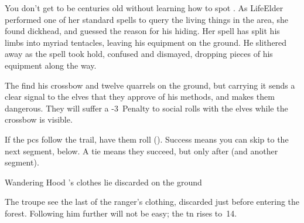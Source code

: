 \begin{exampletext}
  You don't get to be centuries old without learning how to spot .
  As \gls{LifeElder} performed one of her standard spells to query the living things in the area, she found \gls{dickhead}, and guessed the reason for his hiding.
  Her spell has split his limbs into myriad tentacles, leaving his equipment on the ground.
  He slithered away as the spell took hold, confused and dismayed, dropping pieces of his equipment along the way.
\end{exampletext}

The find his \gls{crossbow} and twelve quarrels on the ground, but carrying it sends a clear signal to the elves that they approve of his methods, and makes them dangerous.
They will suffer a -3~Penalty to social rolls with the elves while the \gls{crossbow} is visible.

If the \glspl{pc} follow the trail, have them roll  (\tn[10]).
Success means you can skip to the next \gls{segment}, below.
A tie means they succeed, but only after  (and another \gls{segment}).

{Wandering Hood}%
{'s clothes lie discarded on the ground}%

The troupe see the last of the ranger's clothing, discarded just before entering the forest.
Following him further will not be easy; the \gls{tn} rises to~14.


